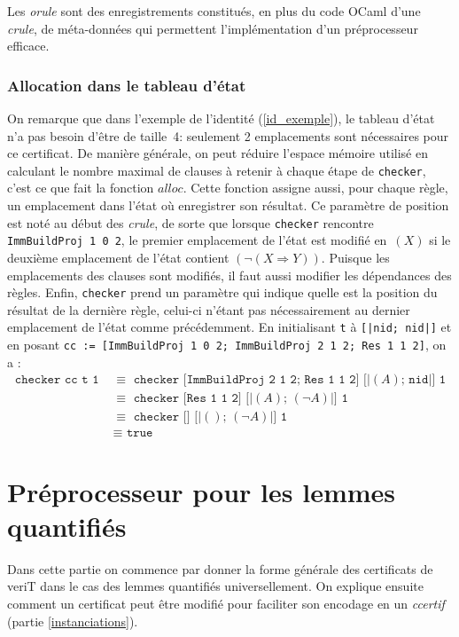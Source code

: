 \documentclass[11pt]{article}
\begin{document}
 Les \textit{orule} sont des enregistrements constitués, en plus du code OCaml d'une \textit{crule}, de méta-données qui permettent l'implémentation d'un préprocesseur efficace.

\subsubsection{Allocation dans le tableau d'état} \label{alloc}

On remarque que dans l'exemple de l'identité (\ref{id_exemple}), le tableau d'état n'a pas besoin d'être de taille~4: seulement 2 emplacements sont nécessaires pour ce certificat. De manière générale, on peut réduire l'espace mémoire utilisé en calculant le nombre maximal de clauses à retenir à chaque étape de \texttt{checker}, c'est ce que fait la fonction $alloc$. Cette fonction assigne aussi, pour chaque règle, un emplacement dans l'état où enregistrer son résultat. Ce paramètre de position est noté au début des \textit{crule}, de sorte que lorsque \texttt{checker} rencontre \texttt{ImmBuildProj 1 0 2}, le premier emplacement de l'état est modifié en~$(X)$ si le deuxième emplacement de l'état contient $(\neg(X \Rightarrow Y))$. Puisque les emplacements des clauses sont modifiés, il faut aussi modifier les dépendances des règles. Enfin, \texttt{checker} prend un paramètre qui indique quelle est la position du résultat de la dernière règle, celui-ci n'étant pas nécessairement au dernier emplacement de l'état comme précédemment. En initialisant \texttt{t} à \texttt{[|nid; nid|]} et en posant \texttt{cc := [ImmBuildProj 1 0 2; ImmBuildProj 2 1 2; Res 1 1 2]}, on a :
\begin{align*}
  \texttt{checker cc t 1} \,\,&\equiv \,\, \texttt{checker [ImmBuildProj 2 1 2; Res 1 1 2] [|}(A)\texttt{; nid|] 1} \\
    &\equiv \,\,\texttt{checker [Res 1 1 2] [|}(A)\texttt{; }(\neg A)\texttt{|] 1} \\
    &\equiv \,\,\texttt{checker [] [|}()\texttt{; }(\neg A)\texttt{|] 1} \\
    &\equiv \,\,\texttt{true}
\end{align*}


\section{Préprocesseur pour les lemmes quantifiés}

Dans cette partie on commence par donner la forme générale des certificats de veriT dans le cas des lemmes quantifiés universellement. On explique ensuite comment un certificat peut être modifié pour faciliter son encodage en un \textit{ccertif} (partie \ref{instanciations}).\medbreak
\end{document}
